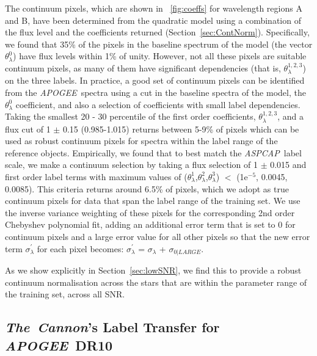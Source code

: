 \documentclass[12pt, preprint]{aastex}
\newcommand{\sectionname}{Section}
\newcommand{\tc}{\textsl{The~Cannon}}
\newcommand{\apogee}{\textsl{APOGEE}}
\newcommand{\aspcap}{\textsl{ASPCAP}}
\begin{document}
The continuum pixels, which are shown in \figurename~\ref{fig:coeffs} for wavelength regions A and B, 
have been determined from the quadratic model using a combination of the flux level and the coefficients returned
(\sectionname~\ref{sec:ContNorm}). Specifically, we found that 35\% of the pixels in the baseline spectrum of the model (the vector $\theta^0_\lambda$) have flux levels within 1\% of unity. However, not all these pixels are suitable continuum pixels, as many of them have significant dependencies (that is, $\theta^{1,2,3}_\lambda$)
on the three labels. In practice, a good set of continuum pixels can be identified from the \apogee\ spectra using a cut in the baseline spectra of the model, the $\theta^0_\lambda$ coefficient, and also a selection of coefficients with small label dependencies. Taking the smallest 20 - 30 percentile of the first order coefficients, $\theta^{1,2,3}_\lambda$,  and a flux cut of 1 $\pm$ 0.15 (0.985-1.015) returns between 5-9\% of pixels which can be used as robust continuum pixels for spectra within the label range of the reference objects. Empirically, we found that to best match the \aspcap\ label scale, we make a continuum selection by taking a flux selection of 1 $\pm$ 0.015 and first order label terms with maximum values of ($\theta^{1}_\lambda$,$\theta^{2}_\lambda$,$\theta^{3}_\lambda$) $<$ (1e$^{-5}$, 0.0045, 0.0085). This criteria returns around 6.5\% of pixels, which we adopt as true continuum pixels for data that span the label range of the training set. We use the inverse variance weighting of these pixels for the corresponding 2nd order Chebyshev polynomial fit, adding an additional error term that is set to 0 for continuum pixels and a large error value for all other pixels so that the new error term $\sigma^{'}_\lambda$ for each pixel becomes:
$\sigma^{'}_\lambda$ = $\sigma_\lambda$ + $\sigma_{0|LARGE}$. 


As we show explicitly in \sectionname~\ref{sec:lowSNR}, we find this to provide a robust continuum normalisation across the stars that are within the parameter range of the training set, across all SNR. 

\subsection{\tc 's Label Transfer for \apogee\ DR10}
\label{sec:APOGEE_DR10_comparison}
\end{document}
